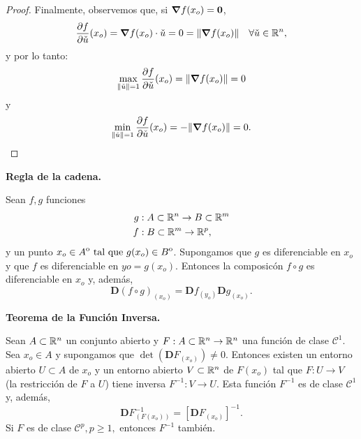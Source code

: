\begin{theorem}
\begin{proof}
Finalmente, observemos que, si $\grad f(x_o) = \mathbf{0}$, 
\[
 \frac{\partial f}{\partial \check{u}} (x_o) = \grad f (x_o) \cdot \check{u} = 0 = \norm{\grad f(x_o)} \quad \forall \check{u} \in \mathbb{R}^n,
\]
y por lo tanto:
\[
 \max_{\norm{\check{u}}=1} \frac{\partial f}{\partial \check{u}} (x_o) = \norm{\grad f(x_o)} = 0
\]
y
\[
 \min_{\norm{\check{u}}=1} \frac{\partial f}{\partial \check{u}} (x_o) = -\norm{\grad f(x_o)} = 0.
\]

\end{proof}

\end{theorem}

\begin{theorem}\textbf{Regla de la cadena.} \label{teo:cadena}
\mbox{}

  Sean $f, g$ funciones 
    \begin{align*}
    g &:A \subset \mathbb{R}^n \to B \subset \mathbb{R}^m \\
    f &:B \subset \mathbb{R}^m \to \mathbb{R}^p,
    \end{align*}
  y un punto $x_o \in {\kern0ptA}^{\mathrm{o}} \text{ tal que } g(x_o) \in {\kern0ptB}^{\mathrm{o}}$. Supongamos que $g$ es diferenciable en $x_o$ y que $f$ es diferenciable en $yo = g(x_o)$. Entonces la composic\'on $f \circ g$ es diferenciable en $x_o$ y, adem\'as,
  \[
   \boldsymbol{D}(f \circ g)_{(x_o)} = \boldsymbol{D}f_{(y_o)} 
   \boldsymbol{D}g_{(x_o)}.
  \]
\end{theorem}

\begin{theorem}\textbf{Teorema de la Funci\'on Inversa.} \label{teo:inversa}
\mbox{}

 Sean $A \subset \mathbb{R}^n$ un conjunto abierto y $F: A \subset \mathbb{R}^n \to \mathbb{R}^n$ una funci\'on de clase $\mathcal{C}^1$. Sea $x_o \in A$ y supongamos que $\det(\boldsymbol{D}F_{(x_o)}) \ne 0$. Entonces existen un entorno abierto $U \subset A$ de $x_o$ y un entorno abierto $V \subset \mathbb{R}^n$ de $F(x_o)$ tal que $F:U \to V$ (la restricci\'on de $F$ a $U$) tiene inversa $F^{-1}:V \to U$. Esta funci\'on $F^{-1}$ es de clase $\mathcal{C}^1$ y, adem\'as,
 \[
  \boldsymbol{D}F^{-1}_{(F(x_o))} = \left[ \boldsymbol{D}F_{(x_o)} \right]^{-1}.
 \]
 Si $F$ es de clase $\mathcal{C}^p, p \ge 1,$ entonces $F^{-1}$ tambi\'en.
\end{theorem}

